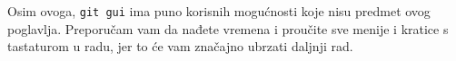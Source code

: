 Osim ovoga, \verb+git gui+ ima puno korisnih mogućnosti koje nisu predmet ovog poglavlja.
Preporučam vam da nađete vremena i proučite sve menije i kratice s tastaturom u radu, jer to će vam značajno ubrzati daljnji rad.



